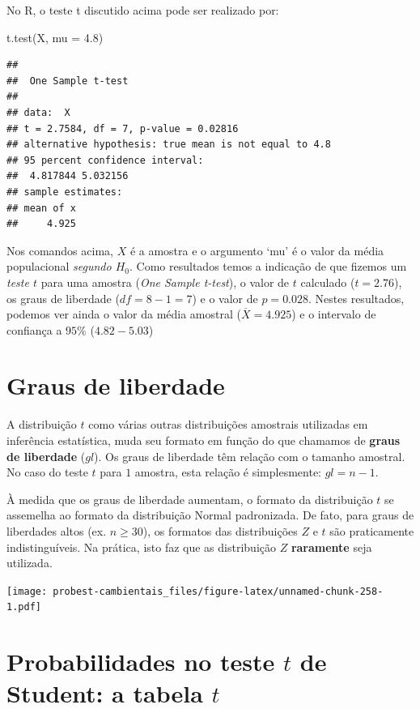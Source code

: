 \documentclass[
]{book}
\newenvironment{Shaded}{\begin{snugshade}}{\end{snugshade}}
\newcommand{\AttributeTok}[1]{\textcolor[rgb]{0.77,0.63,0.00}{#1}}
\newcommand{\FloatTok}[1]{\textcolor[rgb]{0.00,0.00,0.81}{#1}}
\newcommand{\FunctionTok}[1]{\textcolor[rgb]{0.00,0.00,0.00}{#1}}
\newcommand{\NormalTok}[1]{#1}
\begin{document}
No R, o teste t discutido acima pode ser realizado por:

\begin{Shaded}
\begin{Highlighting}[]
\FunctionTok{t.test}\NormalTok{(X, }\AttributeTok{mu =} \FloatTok{4.8}\NormalTok{)}
\end{Highlighting}
\end{Shaded}

\begin{verbatim}
## 
##  One Sample t-test
## 
## data:  X
## t = 2.7584, df = 7, p-value = 0.02816
## alternative hypothesis: true mean is not equal to 4.8
## 95 percent confidence interval:
##  4.817844 5.032156
## sample estimates:
## mean of x 
##     4.925
\end{verbatim}

Nos comandos acima, \(X\) é a amostra e o argumento `mu' é o valor da média populacional \emph{segundo \(H_0\)}. Como resultados temos a indicação de que fizemos um \emph{teste \(t\)} para uma amostra (\emph{One Sample t-test}), o valor de \(t\) calculado (\(t = 2.76\)), os graus de liberdade (\(df = 8 - 1 = 7\)) e o valor de \(p = 0.028\). Nestes resultados, podemos ver ainda o valor da média amostral (\(\overline{X} = 4.925\)) e o intervalo de confiança a \(95\%\) (\(4.82 - 5.03\))

\hypertarget{graus-de-liberdade}{%
\section{Graus de liberdade}\label{graus-de-liberdade}}

A distribuição \(t\) como várias outras distribuições amostrais utilizadas em inferência estatística, muda seu formato em função do que chamamos de \textbf{graus de liberdade} (\(gl\)). Os graus de liberdade têm relação com o tamanho amostral. No caso do teste \(t\) para \(1\) amostra, esta relação é simplesmente: \(gl = n-1\).

À medida que os graus de liberdade aumentam, o formato da distribuição \(t\) se assemelha ao formato da distribuição Normal padronizada. De fato, para graus de liberdades altos (ex. \(n \ge 30\)), os formatos das distribuições \(Z\) e \(t\) são praticamente indistinguíveis. Na prática, isto faz que as distribuição \(Z\) \textbf{raramente} seja utilizada.

\texttt{[image: probest-cambientais\_files/figure-latex/unnamed-chunk-258-1.pdf]}

\hypertarget{probabilidades-no-teste-t-de-student-a-tabela-t}{%
\section{\texorpdfstring{Probabilidades no teste \(t\) de Student: a tabela \(t\)}{Probabilidades no teste t de Student: a tabela t}}\label{probabilidades-no-teste-t-de-student-a-tabela-t}}
\end{document}
